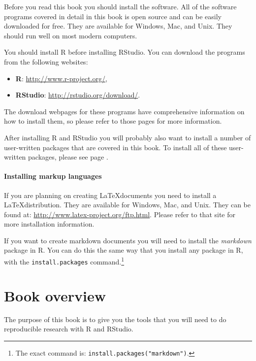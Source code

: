 Before you read this book you should install the software. All of the software programs covered in detail in this book is open source and can be easily downloaded for free. They are available for Windows, Mac, and Unix. They should run well on most modern computers. 

You should install R before installing RStudio. You can download the programs from the following websites:

\begin{itemize}
    \item {\bf{R}}: \url{http://www.r-project.org/},
    \item {\bf{RStudio}}: \url{http://rstudio.org/download/}.
\end{itemize}

\noindent The download webpages for these programs have comprehensive information on how to install them, so please refer to those pages for more information.

After installing R and RStudio you will probably also want to install a number of user-written packages that are covered in this book. To install all of these user-written packages, please see page \pageref{ReqPackages}.

\paragraph{Installing markup languages}

If you are planning on creating \LaTeX documents you need to install a \LaTeX distribution. They are available for Windows, Mac, and Unix. They can be found at: \url{http://www.latex-project.org/ftp.html}. Please refer to that site for more installation information.

If you want to create markdown documents you will need to install the {\emph{markdown}} package in R. You can do this the same way that you install any package in R, with the {\tt{install.packages}} command.\footnote{The exact command is: {\tt{install.packages("markdown")}}.} 


\section{Book overview}

The purpose of this book is to give you the tools that you will need to do reproducible research with R and RStudio. 


